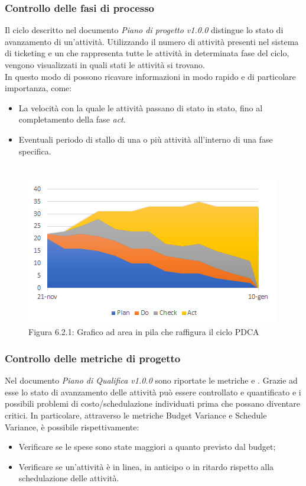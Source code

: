 \subsubsection{Controllo delle fasi di processo}
Il ciclo  descritto nel documento \emph{Piano di progetto v1.0.0} distingue lo stato di avanzamento di un'attività. Utilizzando il numero di attività presenti nel sistema di ticketing e un  che rappresenta tutte le attività in determinata fase del ciclo, vengono visualizzati in quali stati le attività si trovano. \\
In questo modo di possono ricavare informazioni in  modo rapido e di particolare importanza, come:
\begin{itemize}
\item{La velocità con la quale le attività passano di stato in stato, fino al completamento della fase \emph{act}.}
\item{Eventuali periodo di stallo di una o più attività all'interno di una fase specifica.} \\ \\
\end{itemize}  
\begin{figure} [H]
	\centering
	\includegraphics[scale=1]{../PianoDiProgetto/Img/Grafico_PDCA.png}
	\caption{Figura 6.2.1: Grafico ad area in pila che raffigura il ciclo PDCA}\label{}
\end{figure} 
\subsubsection{Controllo delle metriche di progetto}
Nel documento \emph{Piano di Qualifica v1.0.0} sono riportate le metriche  e . Grazie ad esse lo stato di avanzamento delle attività può essere controllato e quantificato e i possibili problemi di costo/schedulazione individuati prima che possano diventare critici. In particolare, attraverso le metriche Budget Variance e Schedule Variance, è possibile rispettivamente:
\begin{itemize}
\item{Verificare se le spese sono state maggiori a quanto previsto dal budget;}
\item{Verificare se un'attività è in linea, in anticipo o in ritardo rispetto alla schedulazione delle attività.}
\end{itemize}

